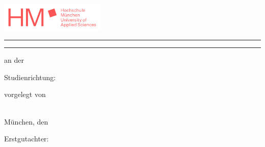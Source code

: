 \thispagestyle{empty}


\begin{minipage}[c][\textheight][s]{\textwidth}

\begin{flushright}
\includegraphics[width=5cm,keepaspectratio]{logos/hm_logo.png}
\end{flushright}

\vspace{0.5cm}

\noindent\rule{\linewidth}{0.4mm}

\vspace{0.5cm}

\begin{flushright}
  \sffamily\bfseries\Large
  \parbox{0.9\textwidth}{\raggedleft\getTitle}
  
  \vspace{0.3cm}
  
  {\large\getAuthor}
\end{flushright}

\vspace{0.5cm}

\noindent\rule{\linewidth}{0.4mm}

\vfill

\begin{center}
  \large
  \getDoctype
  
  \vspace{0.3cm}
  
  an der \getUniversity\\
  \getFaculty
  
  \vspace{0.5cm}
  
  Studienrichtung: \getCourse
  
  \vspace{0.5cm}
  
  vorgelegt von\\
  \getAuthor\ 
  
  \vfill
  
  München, den \getSubmissionDate
  
  \vspace{0.5cm}
  
  Erstgutachter: \getSupervisor
\end{center}

\end{minipage}
\clearpage